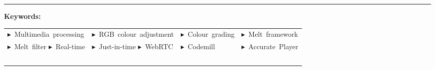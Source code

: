 \documentclass[12pt,a4paper]{article}
\newcommand{\RedVioletTriangleright}{\textcolor{RedViolet}{$\blacktriangleright$}}
\begin{document}
\begin{abstract}
	
	\begin{spacing}{1}


	\noindent This thesis project lays in the field of real-time multimedia processing, focusing on the user-sided adjustment of RGB values in video streaming using  Just-In-Time (JIT) techniques and the Melt framework. 
	This is implemented in Codemill's Accurate Player and using Web Real-Time Communication (WebRTC) as a data channel.
	Colour theory and RGB colour representation is introduced and knowledge on the technical components especially the structure and usage of the Melt framework is given.
	
	
	\noindent The first part of the research question aims to evaluate the feasibility of the real-time colour adjustment.
	The implementation is achievable and described. A comparison of different Melt filters is included, to select the most suitable filter for the RGB adjustment.	
	
	
	\noindent The second part of the research question considers the comparison of video colour grading results with Melt filters, that were applied on different platforms: The Accurate Player, the locally installed Melt framework and KDEN Live. 
	For this, frames of the different platforms were extracted and subtracted from each to show differences in the colour saturations.
	
	\end{spacing}
	
\end{abstract}
{\color{RedViolet}\dotfill}

{\color{RedViolet} \rule{\textwidth}{1pt}}

\vfill

\textbf{Keywords:}



\begin{adjustbox}{width=1\textwidth}
	\begin{tabular}{llll}
		\RedVioletTriangleright~Multimedia~processing & \RedVioletTriangleright~RGB~colour~adjustment & \RedVioletTriangleright~Colour~grading & \RedVioletTriangleright~Melt~framework \\
		\RedVioletTriangleright~Melt~filter \RedVioletTriangleright~Real-time & \RedVioletTriangleright~Just-in-time \RedVioletTriangleright~WebRTC &  \RedVioletTriangleright~Codemill & \RedVioletTriangleright~Accurate~Player \\
		\ & \ & \ & \ \\
	\end{tabular}
\end{adjustbox}
\end{document}

